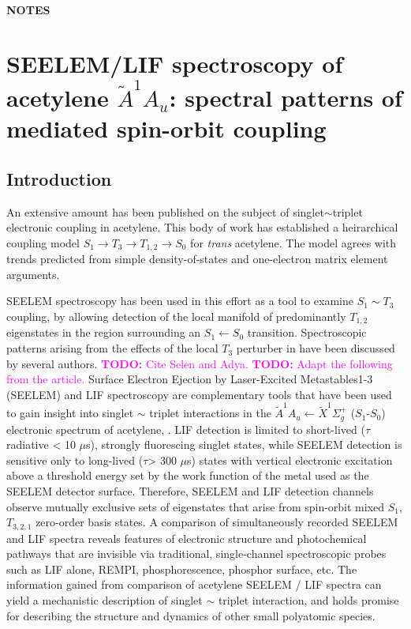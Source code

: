 \documentclass[12pt,draft]{mitthesis}
\newcommand{\TODO} [1]{\textcolor{magenta}{\textbf{TODO:} #1}}
\begin{document}
\tableofcontents
\clearpage

\subsubsection*{NOTES}

\clearpage

\chapter{SEELEM/LIF spectroscopy of 
  acetylene $\tilde{A} ^1A_u$: 
spectral patterns of mediated spin-orbit coupling
}

\section{Introduction}

An extensive amount has been published on the subject of
singlet$\sim$triplet electronic coupling in acetylene.  This body of
work has established a heirarchical coupling model $S_1 \rightarrow
T_3 \rightarrow T_{1,2} \rightarrow S_0$ for \emph{trans} acetylene.
The model agrees with trends predicted from simple density-of-states
and one-electron matrix element arguments.

SEELEM spectroscopy has been used in this effort as a tool to examine
$S_1 \sim T_3$ coupling, by allowing detection of the local manifold
of predominantly $T_{1,2}$ eigenstates in the region surrounding an
$S_1 \leftarrow S_0$ transition.  Spectroscopic patterns arising from
the effects of the local $T_3$ perturber in have been discussed by
several authors.  \TODO{Cite Selen and Adya.}  \TODO{Adapt the
  following from the article.}  Surface Electron Ejection by
Laser-Excited Metastables1-3 (SEELEM) and LIF spectroscopy are
complementary tools that have been used to gain insight into singlet
$\sim$ triplet interactions in the $\tilde{A} ^1A_u \leftarrow
\tilde{X} ^1\Sigma_g^+$ ($S_1$-$S_0$) electronic spectrum of
acetylene, .  LIF detection is limited to short-lived
($\tau$radiative < 10 $\mu$s), strongly fluorescing singlet states,
while SEELEM detection is sensitive only to long-lived ($\tau$> 300
$\mu$s) states with vertical electronic excitation above a threshold
energy set by the work function of the metal used as the SEELEM
detector surface. Therefore, SEELEM and LIF detection channels observe
mutually exclusive sets of eigenstates that arise from spin-orbit
mixed $S_1$, $T_{3,2,1}$ zero-order basis states.  A comparison of
simultaneously recorded SEELEM and LIF spectra reveals features of
electronic structure and photochemical pathways that are invisible via
traditional, single-channel spectroscopic probes such as LIF alone,
REMPI, phosphorescence, phosphor surface, etc. The information
gained from comparison of acetylene SEELEM / LIF spectra can yield a
mechanistic description of singlet $\sim$ triplet interaction, and
holds promise for describing the structure and dynamics of other small
polyatomic species.  
\end{document}
